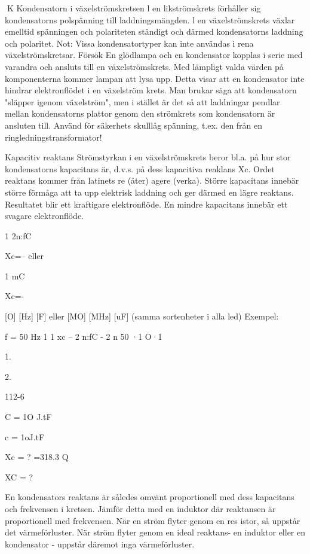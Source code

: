 K
Kondensatorn i växelströmskretsen
l en likströmskrets förhåller sig kondensatorns polspänning till laddningsmängden. l
en växelströmskrets växlar emelltid spänningen och polariteten ständigt och därmed
kondensatorns laddning och polaritet.
Not: Vissa kondensatortyper kan inte användas i rena växelströmskretsar.
Försök
En glödlampa och en kondensator kopplas i
serie med varandra och ansluts till en
växelströmskrets. Med lämpligt valda värden på komponenterna kommer lampan att
lysa upp.
Detta visar att en kondensator inte hindrar elektronflödet i en växelström krets. Man
brukar säga att kondensatorn "släpper igenom växelström", men i stället är det så att
laddningar pendlar mellan kondensatorns
plattor genom den strömkrets som kondensatorn är ansluten till.
Använd för säkerhets skulllåg spänning,
t.ex. den från en ringledningstransformator!

Kapacitiv reaktans
Strömstyrkan i en växelströmskrets beror
bl.a. på hur stor kondensatorns kapacitans
är, d.v.s. på dess kapacitiva reaklans Xc.
Ordet reaktans kommer från latinets re
(åter) agere (verka).
Större kapacitans innebär större förmåga att ta upp elektrisk laddning och ger
därmed en lägre reaktans. Resultatet blir ett
kraftigare elektronflöde. En mindre kapacitans innebär ett svagare elektronflöde.

1
2n:fC

Xc=-- eller

1
mC

Xc=-

[O]
[Hz]
[F]
eller
[MO]
[MHz]
[uF]
(samma sortenheter i alla led)
Exempel:

f = 50 Hz
1
1
xc -- 2 n:fC - 2 n 50 ·1 O·1

1.

2.

112-6

C = 1O J.tF

c = 1oJ.tF

Xc = ?
=318.3 Q

XC = ?

En kondensators reaktans är således
omvänt proportionell med dess kapacitans
och frekvensen i kretsen.
Jämför detta med en induktor där reaktansen är proportionell med frekvensen.
När en ström flyter genom en res istor, så
uppstår det värmeförluster. När ström flyter
genom en ideal reaktans- en induktor eller
en kondensator - uppstår däremot inga
värmeförluster.

